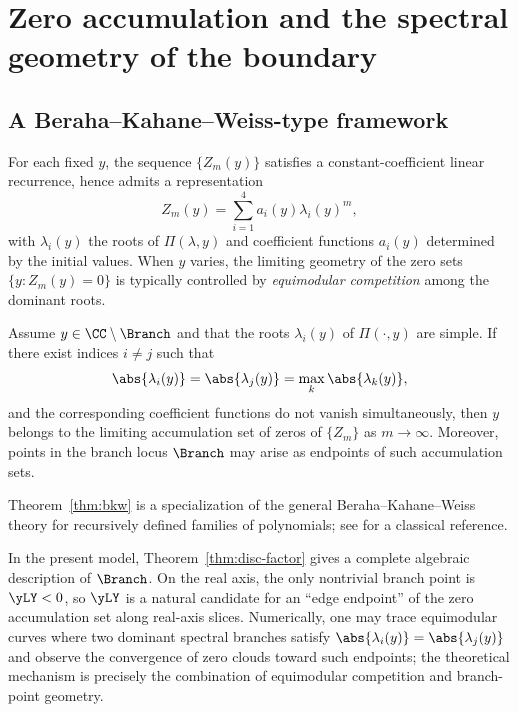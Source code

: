 \section{Zero accumulation and the spectral geometry of the boundary}\label{sec:zeros}

\subsection{A Beraha--Kahane--Weiss-type framework}

For each fixed \(y\), the sequence \(\{Z_m(y)\}\) satisfies a constant-coefficient linear recurrence, hence admits a representation
\[
Z_m(y)=\sum_{i=1}^4 a_i(y)\lambda_i(y)^m,
\]
with \(\lambda_i(y)\) the roots of \(\Pi(\lambda,y)\) and coefficient functions \(a_i(y)\) determined by the initial values.
When \(y\) varies, the limiting geometry of the zero sets \(\{y: Z_m(y)=0\}\) is typically controlled by \emph{equimodular competition} among the dominant roots.

\begin{theorem}\label{thm:bkw}
Assume \(y\in\CC\setminus\Branch\) and that the roots \(\lambda_i(y)\) of \(\Pi(\cdot,y)\) are simple.
If there exist indices \(i\neq j\) such that
\[
\abs{\lambda_i(y)}=\abs{\lambda_j(y)}=\max_k \abs{\lambda_k(y)},
\]
and the corresponding coefficient functions do not vanish simultaneously, then \(y\) belongs to the limiting accumulation set of zeros of \(\{Z_m\}\) as \(m\to\infty\).
Moreover, points in the branch locus \(\Branch\) may arise as endpoints of such accumulation sets.
\end{theorem}

\begin{remark}
Theorem~\ref{thm:bkw} is a specialization of the general Beraha--Kahane--Weiss theory for recursively defined families of polynomials; see \cite{BerahaKahaneWeiss1975} for a classical reference.
\end{remark}

In the present model, Theorem~\ref{thm:disc-factor} gives a complete algebraic description of \(\Branch\).
On the real axis, the only nontrivial branch point is \(\yLY<0\), so \(\yLY\) is a natural candidate for an ``edge endpoint'' of the zero accumulation set along real-axis slices.
Numerically, one may trace equimodular curves where two dominant spectral branches satisfy \(\abs{\lambda_i(y)}=\abs{\lambda_j(y)}\) and observe the convergence of zero clouds toward such endpoints; the theoretical mechanism is precisely the combination of equimodular competition and branch-point geometry.

